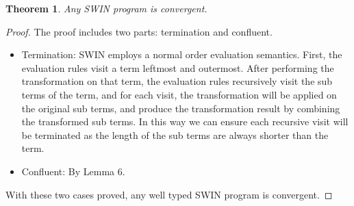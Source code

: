 \documentclass[letterpaper]{article}
\newtheorem{theorem}{Theorem}
\begin{document}
\begin{theorem}
  Any SWIN program is convergent.
\end{theorem}
\begin{proof}
The proof includes two parts: termination and confluent.
\begin{itemize}
\item Termination: SWIN employs a normal order evaluation semantics. First, the evaluation rules visit
a term leftmost and outermost. After performing the transformation on that term, the evaluation 
rules recursively visit the sub terms of the term, and for each visit, the transformation
will be applied on the original sub terms, and produce the transformation result by combining
the transformed sub terms. 
In this way we can ensure each recursive visit will be 
terminated as the length of the sub terms 
are always shorter than the term.

\item Confluent: By Lemma 6.
\end{itemize}

With these two cases proved, any well typed SWIN program is convergent.
\end{proof}
\end{document}
